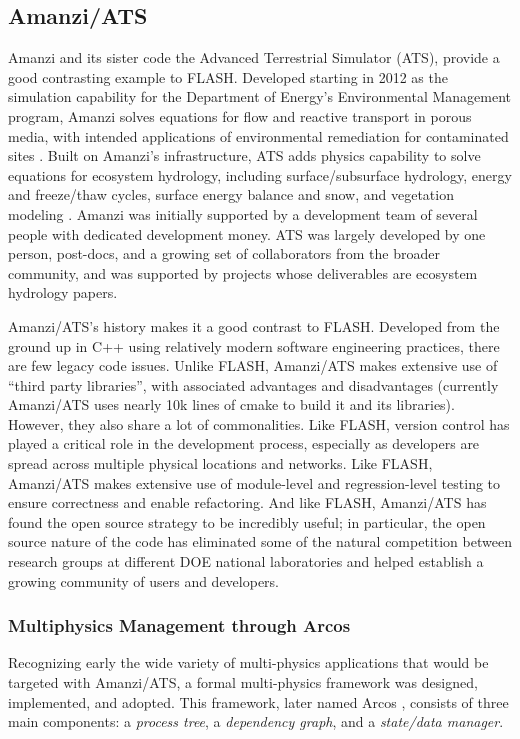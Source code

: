 \subsection{Amanzi/ATS}
\label{sec:amanzi}
%
Amanzi and its sister code the Advanced Terrestrial Simulator (ATS),
provide a good contrasting example to FLASH.  Developed starting in
2012 as the simulation capability for the Department of Energy's
Environmental Management program, Amanzi solves equations for flow and
reactive transport in porous media, with intended applications of
environmental remediation for contaminated sites \cite{MoultonMD12}.
Built on Amanzi's infrastructure, ATS adds physics capability to solve
equations for ecosystem hydrology, including surface/subsurface
hydrology, energy and freeze/thaw cycles, surface energy balance and
snow, and vegetation modeling \cite{PainterMW13,AtchleyPHC15}.  Amanzi
was initially supported by a development team of several people with
dedicated development money.  ATS was largely developed by one person,
post-docs, and a growing set of collaborators from the broader
community, and was supported by projects whose deliverables are
ecosystem hydrology papers.

Amanzi/ATS's history makes it a good contrast to FLASH.  Developed
from the ground up in C++ using relatively modern software engineering
practices, there are few legacy code issues.  Unlike FLASH, Amanzi/ATS
makes extensive use of ``third party libraries'', with associated
advantages and disadvantages (currently Amanzi/ATS uses nearly 10k
lines of cmake to build it and its libraries).  However, they also
share a lot of commonalities.  Like FLASH, version control has played
a critical role in the development process, especially as developers
are spread across multiple physical locations and networks.  Like
FLASH, Amanzi/ATS makes extensive use of module-level and
regression-level testing to ensure correctness and enable refactoring.
And like FLASH, Amanzi/ATS has found the open source strategy to be
incredibly useful; in particular, the open source nature of the code
has eliminated some of the natural competition between research groups
at different DOE national laboratories and helped establish a growing
community of users and developers.

\subsubsection{Multiphysics Management through Arcos}
\label{sec:amanzi:arcos} Recognizing early the wide variety of
multi-physics applications that would be targeted with Amanzi/ATS, a
formal multi-physics framework was designed, implemented, and adopted.
This framework, later named Arcos \cite{CoonMP16}, consists of three
main components: a \emph{process tree}, a \emph{dependency graph}, and
a \emph{state/data manager}.

